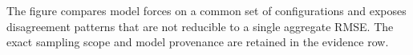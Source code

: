 The figure compares model forces on a common set of configurations and exposes disagreement patterns that are not reducible to a single aggregate RMSE. The exact sampling scope and model provenance are retained in the evidence row.
